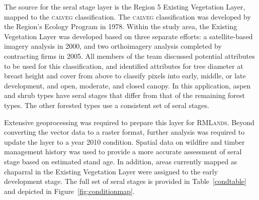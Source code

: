 The source for the seral stage layer is the Region 5 Existing Vegetation Layer, mapped to the \textsc{calveg} classification. The \textsc{calveg} classification was developed by the Region's Ecology Program in 1978. Within the study area, the Existing Vegetation Layer was developed based on three separate efforts: a satellite-based imagery analysis in 2000, and two orthoimagery analysis completed by contracting firms in 2005. All members of the team discussed potential attributes to be used for this classification, and identified attributes for tree diameter at breast height and cover from above to classify pixels into early, middle, or late development, and open, moderate, and closed canopy. In this application, aspen and shrub types have seral stages that differ from that of the remaining forest types. The other forested types use a consistent set of seral stages.

Extensive geoprocessing was required to prepare this layer for \textsc{RMLands}. Beyond converting the vector data to a raster format, further analysis was required to update the layer to a year 2010 condition. Spatial data on wildfire and timber management history was used to provide a more accurate assessment of seral stage based on estimated stand age. In addition, areas currently mapped as chaparral in the Existing Vegetation Layer were assigned to the early development stage. The full set of seral stages is provided in Table~\ref{condtable} and depicted in Figure~\ref{fig:conditionmap}.


